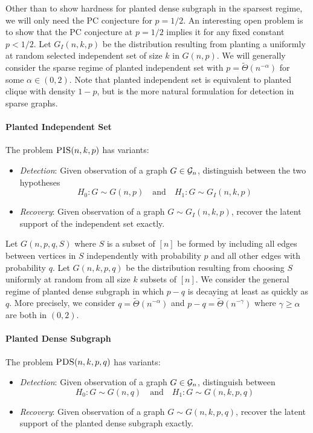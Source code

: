 \documentclass[11pt]{article}
\begin{document}
Other than to show hardness for planted dense subgraph in the sparsest regime, we will only need the PC conjecture for $p = 1/2$. An interesting open problem is to show that the PC conjecture at $p = 1/2$ implies it for any fixed constant $p < 1/2$. Let $G_I(n, k, p)$ be the distribution resulting from planting a uniformly at random selected independent set of size $k$ in $G(n, p)$. We will generally consider the sparse regime of planted independent set with $p = \tilde{\Theta}(n^{-\alpha})$ for some $\alpha \in (0, 2)$. Note that planted independent set is equivalent to planted clique with density $1 - p$, but is the more natural formulation for detection in sparse graphs.

\paragraph{Planted Independent Set} The problem $\textsc{PIS}(n, k, p)$ has variants:
\begin{itemize}
\item \emph{Detection}: Given observation of a graph $G \in \mathcal{G}_n$, distinguish between the two hypotheses
$$H_0: G \sim G(n, p) \quad \text{and} \quad H_1 : G \sim G_I(n, k, p)$$
\item \emph{Recovery}: Given observation of a graph $G \sim G_I(n, k, p)$, recover the latent support of the independent set exactly.
\end{itemize}

Let $G(n, p, q, S)$ where $S$ is a subset of $[n]$ be formed by including all edges between vertices in $S$ independently with probability $p$ and all other edges with probability $q$. Let $G(n, k, p, q)$ be the distribution resulting from choosing $S$ uniformly at random from all size $k$ subsets of $[n]$. We consider the general regime of planted dense subgraph in which $p - q$ is decaying at least as quickly as $q$. More precisely, we consider $q = \tilde{\Theta}(n^{-\alpha})$ and $p - q = \tilde{\Theta}(n^{-\gamma})$ where $\gamma \ge \alpha$ are both in $(0, 2)$.

\paragraph{Planted Dense Subgraph} The problem $\textsc{PDS}(n, k, p, q)$ has variants:
\begin{itemize}
\item \emph{Detection}: Given observation of a graph $G \in \mathcal{G}_n$, distinguish between
$$H_0: G \sim G(n, q) \quad \text{and} \quad H_1 : G \sim G(n, k, p, q)$$
\item \emph{Recovery}: Given observation of a graph $G \sim G(n, k, p, q)$, recover the latent support of the planted dense subgraph exactly.
\end{itemize}
\end{document}
